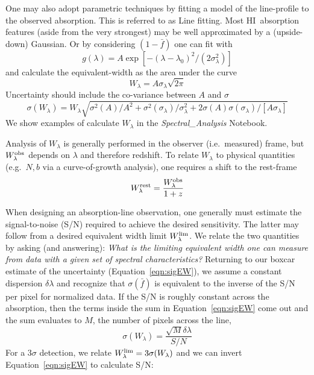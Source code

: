 \documentclass[graybox]{svmult}
\newcommand{\HI}{H{\sc I}}
\begin{document}
One may also adopt parametric techniques by fitting a model
of the line-profile to the observed absorption.  This is
referred to as Line fitting.  Most \HI\ absorption features
(aside from the very strongest) may be
well approximated by a (upside-down) Gaussian.  Or by   
considering $(1-\bar f)$ one can fit with
\begin{equation}
g(\lambda) = A \exp[- (\lambda-\lambda_0)^2 / (2 \sigma_\lambda^2)]
\end{equation}
and calculate the equivalent-width as the 
area under the curve
\begin{equation}
W_\lambda = A \sigma_\lambda \sqrt{2 \pi}
\end{equation}
Uncertainty should include the co-variance between $A$ and $\sigma$
\begin{equation}
\sigma(W_\lambda) = W_\lambda \sqrt{\sigma^2(A)/A^2 +
		\sigma^2(\sigma_\lambda)/\sigma_\lambda^2 + 2 \sigma(A)\sigma(\sigma_\lambda)/[A \sigma_\lambda]}
\end{equation}
We show examples of calculate $W_\lambda$ in the
{\it Spectral\_Analysis} Notebook.

Analysis of $W_\lambda$ is 
generally performed in the observer (i.e.\ measured) frame,
but $W_\lambda^{\rm obs}$ depends on $\lambda$ and therefore redshift.
To relate $W_\lambda$ to physical quantities (e.g.\ $N,b$ via a
curve-of-growth analysis),  one requires a shift to the rest-frame
\begin{equation}
W_\lambda^{\rm rest} = \frac{W_\lambda^{\rm obs}}{1+z}
\end{equation}

When designing an absorption-line observation, one generally
must estimate the signal-to-noise (S/N) required to achieve
the desired sensitivity.   The latter may follow from a
desired equivalent width limit $W_\lambda^{\rm lim}$.
We relate the two quantities by asking (and answering):
{\it What is the limiting equivalent width one can measure from
data with a given set of spectral characteristics?}
Returning to our boxcar estimate of the uncertainty 
(Equation~\ref{eqn:sigEW}), we 
assume a constant dispersion $\delta\lambda$ and
recognize that $\sigma(\bar f)$ is equivalent to 
the inverse of the S/N per pixel for normalized data.
If the S/N is roughly constant across the absorption,
then the terms inside the sum in Equation~\ref{eqn:sigEW}
come out and the sum evaluates to $M$, the number of pixels
across the line, 
\begin{equation}
\sigma(W_\lambda) = \frac{\sqrt{M} \delta\lambda}{S/N}
\label{eqn:sigSN}
\end{equation}
For a $3\sigma$ detection, we relate 
$W_\lambda^{\rm lim} = 3 \sigma(W_\lambda)$ and we can invert
Equation~\ref{eqn:sigEW} to calculate S/N:
\end{document}
